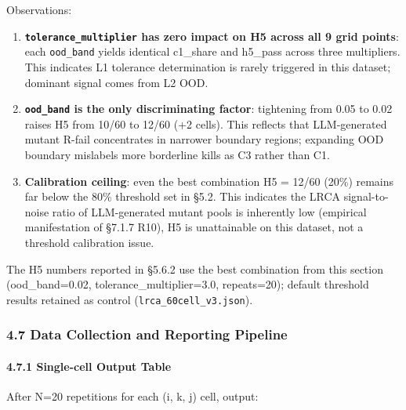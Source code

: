 \documentclass[review,12pt,authoryear]{elsarticle}
\providecommand{\tightlist}{\setlength{\itemsep}{0pt}\setlength{\parskip}{0pt}}
\begin{document}
Observations:

\begin{enumerate}
\def\labelenumi{\arabic{enumi}.}
\tightlist
\item
  \textbf{\texttt{tolerance\_multiplier} has zero impact on H5 across
  all 9 grid points}: each \texttt{ood\_band} yields identical c1\_share
  and h5\_pass across three multipliers. This indicates L1 tolerance
  determination is rarely triggered in this dataset; dominant signal
  comes from L2 OOD.
\item
  \textbf{\texttt{ood\_band} is the only discriminating factor}:
  tightening from 0.05 to 0.02 raises H5 from 10/60 to 12/60 (+2 cells).
  This reflects that LLM-generated mutant R-fail concentrates in
  narrower boundary regions; expanding OOD boundary mislabels more
  borderline kills as C3 rather than C1.
\item
  \textbf{Calibration ceiling}: even the best combination H5 = 12/60
  (20\%) remains far below the 80\% threshold set in §5.2. This
  indicates the LRCA signal-to-noise ratio of LLM-generated mutant pools
  is inherently low (empirical manifestation of §7.1.7 R10), H5 is
  unattainable on this dataset, not a threshold calibration issue.
\end{enumerate}

The H5 numbers reported in §5.6.2 use the best combination from this
section (ood\_band=0.02, tolerance\_multiplier=3.0, repeats=20); default
threshold results retained as control (\texttt{lrca\_60cell\_v3.json}).

\subsubsection{4.7 Data Collection and Reporting
Pipeline}\label{data-collection-and-reporting-pipeline}

\paragraph{4.7.1 Single-cell Output
Table}\label{single-cell-output-table}

After N=20 repetitions for each (i, k, j) cell, output:
\end{document}
